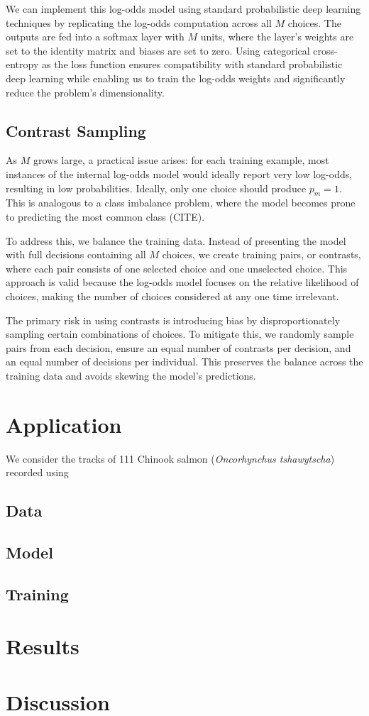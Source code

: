 \documentclass[11pt]{article}
\begin{document}
We can implement this log-odds model using standard probabilistic deep learning techniques by replicating the log-odds computation across all $M$ choices. The outputs are fed into a softmax layer with $M$ units, where the layer's weights are set to the identity matrix and biases are set to zero. Using categorical cross-entropy as the loss function ensures compatibility with standard probabilistic deep learning while enabling us to train the log-odds weights and significantly reduce the problem's dimensionality.

\subsection*{Contrast Sampling}

As $M$ grows large, a practical issue arises: for each training example, most instances of the internal log-odds model would ideally report very low log-odds, resulting in low probabilities. Ideally, only one choice should produce $p_m=1$. This is analogous to a class imbalance problem, where the model becomes prone to predicting the most common class (CITE).

To address this, we balance the training data. Instead of presenting the model with full decisions containing all $M$ choices, we create training pairs, or contrasts, where each pair consists of one selected choice and one unselected choice. This approach is valid because the log-odds model focuses on the relative likelihood of choices, making the number of choices considered at any one time irrelevant.

The primary risk in using contrasts is introducing bias by disproportionately sampling certain combinations of choices. To mitigate this, we randomly sample pairs from each decision, ensure an equal number of contrasts per decision, and an equal number of decisions per individual. This preserves the balance across the training data and avoids skewing the model's predictions.

\section*{Application}

We consider the tracks of 111 Chinook salmon (\textit{Oncorhynchus tshawytscha}) recorded using 

\subsection*{Data}

\subsection*{Model}

\subsection*{Training}

\section*{Results}

\section*{Discussion}



\end{document}
